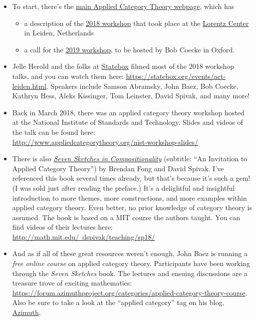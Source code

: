 \documentclass{tufte-handout-tai}
\theoremstyle{plain}
\theoremstyle{definition}
\theoremstyle{remark}
\begin{document}
\begin{itemize}
	\item To start, there's the \href{http://www.appliedcategorytheory.org/}{main Applied Category Theory webpage}, which has
		\begin{itemize}
			\item a description of the \href{http://www.appliedcategorytheory.org/workshops/}{2018 workshop} that took place at the \href{https://www.lorentzcenter.nl/lc/web/2018/969/info.php3?wsid=969&venue=Oort}{Lorentz Center} in Leiden, Netherlands
			\item a call for the \href{http://www.appliedcategorytheory.org/act-2019/}{2019 workshop}, to be hosted by Bob Coecke in Oxford.
		\end{itemize}

	\item Jelle Herold and the folks at \href{https://statebox.org/}{Statebox} filmed most of the 2018 workshop talks, and you can watch them here: \href{https://statebox.org/events/act-leiden.html}{https://statebox.org/events/act-leiden.html}. Speakers include Samson Abramsky, John Baez, Bob Coecke,  Kathryn Hess, Aleks Kissinger, Tom Leinster, David Spivak, and many more!

	\item Back in March 2018, there was an applied category theory workshop hosted at the National Institute of Standards and Technology. Slides and videos of the talk can be found here:\\
	\href{http://www.appliedcategorytheory.org/nist-workshop-slides/}{http://www.appliedcategorytheory.org/nist-workshop-slides/}

	\item There is also \href{https://arxiv.org/pdf/1803.05316.pdf}{\textit{Seven Sketches in Compositionality}} (subtitle: ``An Invitation to Applied Category Theory'') by Brendan Fong and David Spivak. I've referenced this book several times already, but that's because it's such a gem! (I was sold just after reading the preface.) It's a delightful and insightful introduction to more themes, more constructions, and more examples within applied category theory. Even better, no prior knowledge of category theory is assumed. The book is based on a MIT course the authors taught. You can find videos of their lectures here: \href{http://math.mit.edu/~dspivak/teaching/sp18/}{http://math.mit.edu/~dspivak/teaching/sp18/}
	
	\item And as if all of these great resources weren't enough, John Baez is running a \textit{free online course} on applied category theory. Participants have been working through the \textit{Seven Sketches} book. The lectures and ensuing discussions are a treasure trove of exciting mathematics: \href{https://forum.azimuthproject.org/categories/applied-category-theory-course}{https://forum.azimuthproject.org/categories/applied-category-theory-course}. Also be sure to take a look at the ``applied category'' tag on his blog, \href{https://johncarlosbaez.wordpress.com/?s=applied+category}{Azimuth}.
\end{itemize}
\end{document}

